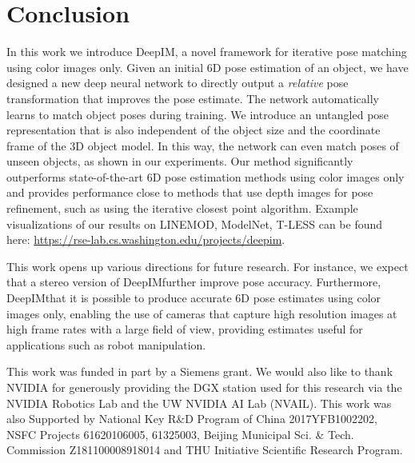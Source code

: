 \documentclass[twocolumn]{svjour3}
\newcommand{\dimnet}[0]{DeepIM}
\begin{document}
\section{Conclusion}

In this work we introduce \dimnet, a novel framework for iterative pose matching using color images only. Given an initial 6D pose estimation of an object, we have designed a new deep neural network to directly output a \emph{relative} pose transformation that improves the pose estimate. The network automatically learns to match object poses during training. We introduce an untangled pose representation that is also independent of the object size and the coordinate frame of the 3D object model. In this way, the network can even match poses of unseen objects, as shown in our experiments. Our method significantly outperforms state-of-the-art 6D pose estimation methods using color images only and provides performance close to methods that use depth images for pose refinement, such as using the iterative closest point algorithm. Example visualizations of our results on LINEMOD, ModelNet, T-LESS can be found here: \url{https://rse-lab.cs.washington.edu/projects/deepim}.

This work opens up various directions for future research. For instance, we expect that a stereo version of \dimnet\could further improve pose accuracy. Furthermore, \dimnet\indicates that it is possible to produce accurate 6D pose estimates using color images only, enabling the use of cameras that capture high resolution images at high frame rates with a large field of view, providing  estimates useful for applications such as robot manipulation.

\begin{acknowledgements}
This work was funded in part by a Siemens grant. We would also like to thank NVIDIA for generously providing the DGX station used for this research via the NVIDIA Robotics Lab and the UW NVIDIA AI Lab (NVAIL). This work was also Supported by National Key R\&D Program of China 2017YFB1002202, NSFC Projects 61620106005, 61325003, Beijing Municipal Sci. \& Tech. Commission Z181100008918014 and THU Initiative Scientific Research Program.
\end{acknowledgements}


\end{document}
